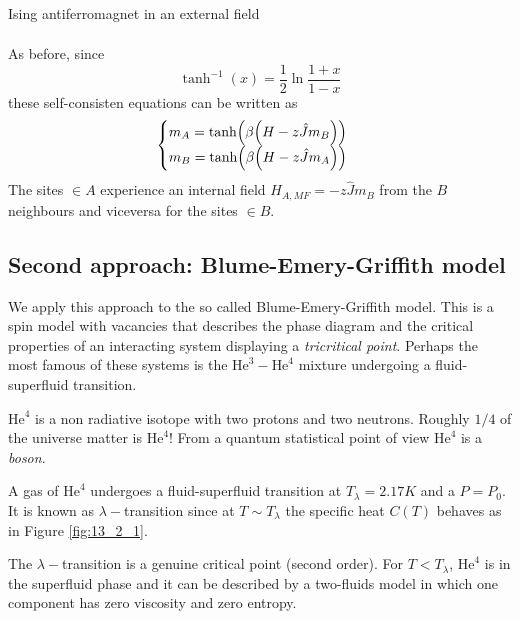 \documentclass[../main/main.tex]{subfiles}
\begin{document}
\begin{example}{Ising antiferromagnet in an external field}{}
\begin{itemize}
\begin{subequations}
\begin{align}
\end{align}
\end{subequations}
As before, since
\begin{equation}
  \tanh^{-1} (x) = \frac{1}{2} \ln{\frac{1+x}{1-x}}
\end{equation}
these self-consisten equations can be written as
\begin{equation}
  \begin{cases}
   m_A = \tanh ( \beta \qty(H - z \hat{J} m_B ) )\\
   m_B = \tanh ( \beta \qty(H - z \hat{J} m_A ) )
  \end{cases}
\end{equation}
The sites \( \in A \) experience an internal field \( H_{A,MF} = - z \hat{J} m_B \) from the \( B \) neighbours and viceversa for the sites \( \in B \).
\end{itemize}
\end{example}

\subsection{Second approach: Blume-Emery-Griffith model}
We apply this approach to the so called Blume-Emery-Griffith model.
This is a spin model with vacancies that describes the phase diagram and the critical properties of an interacting system displaying a \emph{tricritical point}. Perhaps the most famous of these systems is the \( \text{He}^3-\text{He}^4 \) mixture undergoing a fluid-superfluid transition.

\begin{remark}
\( \text{He}^4 \)  is a non radiative isotope with two protons and two neutrons. Roughly \( 1/4 \) of the universe matter is \( \text{He}^4 \)!
From a quantum statistical point of view \( \text{He}^4 \) is a \emph{boson}.

\end{remark}
 A gas of \( \text{He}^4 \) undergoes a fluid-superfluid transition at \( T_ \lambda =2.17 K \) and a \( P=P_0 \). It is known as \( \lambda - \)transition since at \( T \sim T_ \lambda  \)  the specific heat \( C(T) \) behaves as in Figure \ref{fig:13_2_1}.

\begin{remark}
The \( \lambda - \)transition is a genuine critical point (second order). For \( T < T_{\lambda } \), \( \text{He}^4 \)  is in the superfluid phase and it can be described by a two-fluids model in which one component has zero viscosity and zero entropy.
\end{remark}
\end{document}
